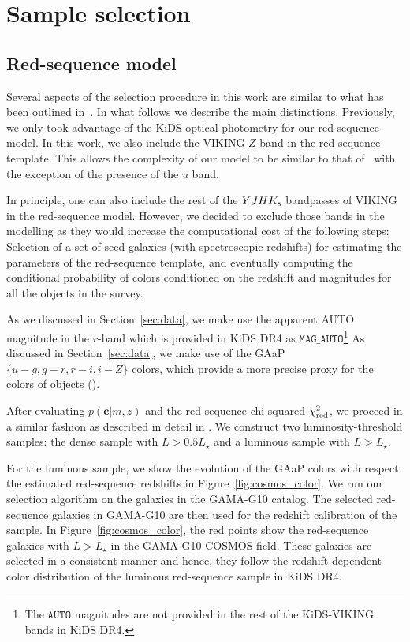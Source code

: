\documentclass[fleqn,usenatbib,useAMS]{mnras}
\begin{document}
\section{Sample selection}\label{sec:selection}

\subsection{Red-sequence model}

Several aspects of the selection procedure in this work are similar to what has been outlined  in~\citet{vakili2019}. In what follows we describe the main distinctions. Previously, we only took advantage of the KiDS optical photometry for our red-sequence model. In this work, we also include the VIKING $Z$ band in the red-sequence template. This allows the complexity of our model to be similar to that of~\citet{rozo2016} with the exception of the presence of the $u$ band.

In principle, one can also include the rest of the $YJHK_{\rm s}$ bandpasses of VIKING in the red-sequence model. However, we decided to exclude those bands in the modelling as they would increase the computational cost of the following steps: Selection of a set of seed galaxies (with spectroscopic redshifts) for estimating the parameters of the red-sequence template, and eventually computing the conditional probability of colors conditioned on the redshift and magnitudes for all the objects in the survey. 

As we discussed in Section~\ref{sec:data}, we make use the apparent AUTO magnitude in the $r$-band which is provided in KiDS DR4 as $\mathtt{MAG\_AUTO}$\footnote{The $\mathtt{AUTO}$ magnitudes are not provided in the rest of the KiDS-VIKING bands in KiDS DR4.} As discussed in Section~\ref{sec:data}, we make use of the GAaP $\{u-g,g-r,r-i,i-Z\}$ colors, which provide a more precise proxy for the colors of objects (\citealt{kuijken2019}). 

After evaluating $p(\boldsymbol{c}|m,z)$ and the red-sequence chi-squared $\chi^{2}_{\rm red}$, we proceed in a similar fashion as described in detail in \citet{rozo2016, vakili2019}. We construct two luminosity-threshold samples: the dense sample with $L>0.5 L_{\star}$ and a luminous sample with $L>L_{\star}$. 

For the luminous sample, we show the evolution of the GAaP colors with respect the estimated red-sequence redshifts in Figure~\ref{fig:cosmos_color}. We run our selection algorithm on the galaxies in the GAMA-G10 catalog. The selected red-sequence galaxies in GAMA-G10 are then used for the redshift calibration of the sample. In Figure~\ref{fig:cosmos_color}, the red points show the red-sequence galaxies with $L>L_{\star}$ in the GAMA-G10 COSMOS field. These galaxies are selected in a consistent manner and hence, they follow the redshift-dependent color distribution of the luminous red-sequence sample in KiDS DR4.
\end{document}
